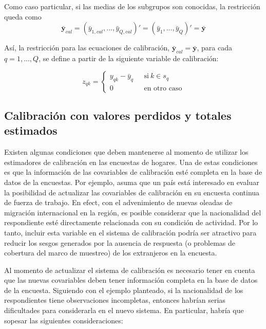 \documentclass[
  12pt,
  spanish,
]{book}
\begin{document}
Como caso particular, si las medias de los subgrupos son conocidas, la restricción queda como
\[
\bar{\textbf{y}}_{cal} = (\bar{y}_{1,cal},...,\bar{y}_{Q,cal})' = (\bar{y}_{1},...,\bar{y}_{Q})' = \bar{\textbf{y}}
\]

Así, la restricción para las ecuaciones de calibración, \(\bar{\textbf{y}}_{cal} = \bar{\textbf{y}}\), para cada \(q = 1,...,Q\), se define a partir de la siguiente variable de calibración:

\begin{equation*}
z_{qk} = 
\begin{cases} 
y_{qk} - \bar{y}_{q} \ \ \ &\text{si} \ k \in s_q \\ 
0 &\text{en otro caso}
\end{cases}
\end{equation*}

\hypertarget{calibraciuxf3n-con-valores-perdidos-y-totales-estimados}{%
\subsection{Calibración con valores perdidos y totales estimados}\label{calibraciuxf3n-con-valores-perdidos-y-totales-estimados}}

Existen algunas condiciones que deben mantenerse al momento de utilizar los estimadores de calibración en las encuestas de hogares. Una de estas condiciones es que la información de las covariables de calibración esté completa en la base de datos de la encuestas. Por ejemplo, asuma que un país está interesado en evaluar la posibilidad de actualizar las covariables de calibración en su encuesta continua de fuerza de trabajo. En efect, con el advenimiento de nuevas oleadas de migración internacional en la región, es posible considerar que la nacionalidad del respondiente esté directamente relacionada con su condición de actividad. Por lo tanto, incluir esta variable en el sistema de calibración podría ser atractivo para reducir los sesgos generados por la ausencia de respuesta (o problemas de cobertura del marco de muestreo) de los extranjeros en la encuesta.

Al momento de actualizar el sistema de calibración es necesario tener en cuenta que las nuevas covariables deben tener información completa en la base de datos de la encuesta. Siguiendo con el ejemplo planteado, si la nacionalidad de los respondientes tiene observaciones incompletas, entonces habrían serias dificultades para considerarla en el nuevo sistema. En particular, habría que sopesar las siguientes consideraciones:
\end{document}
